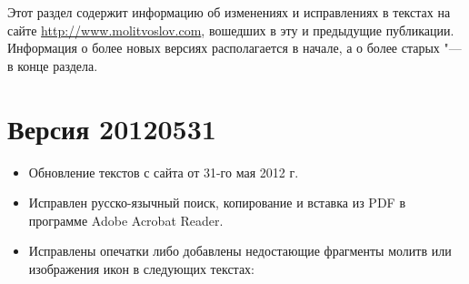 \renewcommand{\ornament}{uzor_begin_9}

Этот раздел содержит информацию об изменениях и исправлениях в текстах на сайте \url{http://www.molitvoslov.com}, вошедших в эту и предыдущие публикации. Информация о более новых версиях располагается в начале, а о более старых "--- в конце раздела.

\small

\section*{Версия 20120531}

\begin{itemize}

\item Обновление текстов с сайта от 31-го мая 2012 г.
\item Исправлен русско-язычный поиск, копирование и вставка из PDF в программе Adobe Acrobat Reader.
\item Исправлены опечатки либо добавлены недостающие фрагменты молитв или изображения икон в следующих текстах:


\end{itemize}
